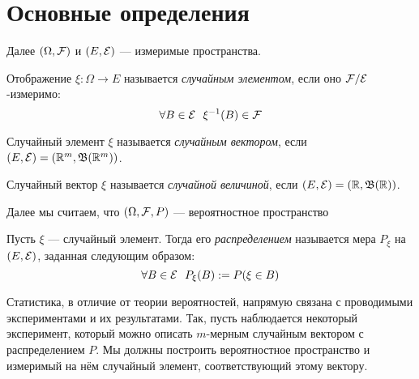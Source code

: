 \section{Основные определения}

\begin{note}
	Далее $(\Omega, \mathcal{F})$ и $(E, \mathcal{E})$ --- измеримые пространства.
\end{note}

\begin{definition}
	Отображение $\xi \colon \Omega \to E$ называется \textit{случайным элементом}, если оно $\mathcal{F}/\mathcal{E}$-измеримо:
	\[
		\forall B \in \mathcal{E}\ \ \xi^{-1}(B) \in \mathcal{F}
	\]
\end{definition}

\begin{definition}
	Случайный элемент $\xi$ называется \textit{случайным вектором}, если $(E, \mathcal{E}) = (\mathbb{R}^m, \mathfrak{B}(\mathbb{R}^m))$.
\end{definition}

\begin{definition}
	Случайный вектор $\xi$ называется \textit{случайной величиной}, если $(E, \mathcal{E}) = (\mathbb{R}, \mathfrak{B}(\mathbb{R}))$.
\end{definition}

\begin{note}
	Далее мы считаем, что $(\Omega, \mathcal{F}, P)$ --- вероятностное пространство
\end{note}

\begin{definition}
	Пусть $\xi$ --- случайный элемент. Тогда его \textit{распределением} называется мера $P_\xi$ на $(E, \mathcal{E})$, заданная следующим образом:
	\[
		\forall B \in \mathcal{E}\ \ P_\xi(B) := P(\xi \in B)
	\]
\end{definition}

\begin{note}
	Статистика, в отличие от теории вероятностей, напрямую связана с проводимыми экспериментами и их результатами. Так, пусть наблюдается некоторый эксперимент, который можно описать $m$-мерным случайным вектором с распределением $P$. Мы должны построить вероятностное пространство и измеримый на нём случайный элемент, соответствующий этому вектору. 
\end{note}

